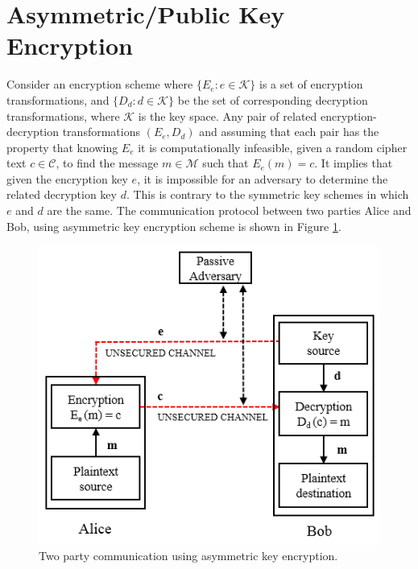 \section{Asymmetric/Public Key Encryption}
	Consider an encryption scheme where $\{E_{e}: e \in \mathcal{K}\}$ is a set of encryption transformations, and $\{D_{d}: d \in \mathcal{K}\}$ be the set of corresponding decryption transformations, where $\mathcal{K}$ is the key space.
	Any pair of related encryption-decryption transformations $(E_{e},D_{d})$ and assuming that each pair has the property that knowing $E_{e}$ it is computationally infeasible, given a random cipher text $c \in \mathcal{C}$, to find the message $m \in \mathcal{M}$ such that $E_{e}(m) = c$.
	It implies that given the encryption key $e$, it is impossible for an adversary to determine the related decryption key $d$.
	This is contrary to the symmetric key schemes in which $e$ and $d$ are the same\cite{menezes2010handbook}.
	The communication protocol between two parties Alice and Bob, using asymmetric key encryption scheme is shown in Figure \ref{fig:public-key}. 
	\begin{figure}[h]
		\centering
		\includegraphics{images/public-key.png}
		\caption{Two party communication using asymmetric key encryption.}
		\label{fig:public-key}
	\end{figure}

